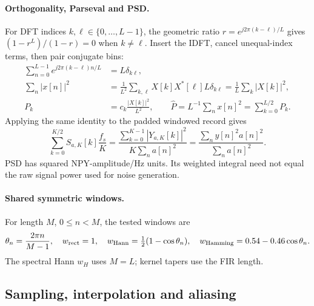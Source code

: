 \paragraph{Orthogonality, Parseval and PSD.}
For DFT indices $k,\ell\in\{0,\ldots,L-1\}$, the geometric ratio
$r=e^{j2\pi(k-\ell)/L}$ gives $(1-r^L)/(1-r)=0$ when $k\ne\ell$.
Insert the IDFT, cancel unequal-index terms, then pair conjugate bins:
\begin{align}
 \sum_{n=0}^{L-1}e^{j2\pi(k-\ell)n/L}&=L\delta_{k\ell},
 \label{eq:finite-orthogonality}\\
 \sum_n|x[n]|^2
 &=\frac1{L^2}\sum_{k,\ell}X[k]X^*[\ell]L\delta_{k\ell}
 =\frac1L\sum_k|X[k]|^2,\label{eq:parseval-steps}\\
 P_k&=c_k\frac{|X[k]|^2}{L^2},\qquad
 \widehat P=L^{-1}\sum_nx[n]^2=\sum_{k=0}^{L/2}P_k.
 \label{eq:parseval}
\end{align}
Applying the same identity to the padded windowed record gives
\begin{equation}
 \sum_{k=0}^{K/2}\widehat S_{a,K}[k]\frac{f_s}{K}
 =\frac{\sum_{k=0}^{K-1}|Y_{a,K}[k]|^2}{K\sum_na[n]^2}
 =\frac{\sum_ny[n]^2a[n]^2}{\sum_na[n]^2}.
 \label{eq:r22-psd-integral}
\end{equation}
PSD has squared NPY-amplitude/Hz units. Its weighted integral need not equal
the raw signal power used for noise generation.

\paragraph{Shared symmetric windows.}
For length $M$, $0\le n<M$, the tested windows are
\citep{numpy21hanning,numpy21hamming}
\begin{equation}
 \theta_n=\frac{2\pi n}{M-1},\quad w_{\rm rect}=1,\quad
 w_{\rm Hann}=\tfrac12(1-\cos\theta_n),\quad
 w_{\rm Hamming}=0.54-0.46\cos\theta_n.
 \label{eq:r22-windows}
\end{equation}
The spectral Hann $w_H$ uses $M=L$; kernel tapers use the FIR length.

\subsection{Sampling, interpolation and aliasing}
\label{app:sampling}
